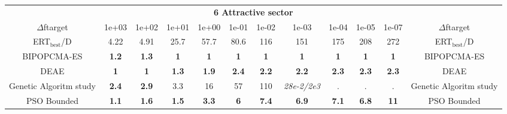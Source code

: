 \begin{tabular}{cccccccccccc}
 & \multicolumn{10}{c}{{\normalsize \textbf{6 Attractive sector}}}\\
$\Delta$ftarget& 1e+03& 1e+02& 1e+01& 1e+00& 1e-01& 1e-02& 1e-03& 1e-04& 1e-05& 1e-07 & $\Delta$ftarget \\
ERT$_{\textrm{best}}$/D& 4.22& 4.91& 25.7& 57.7& 80.6& 116& 151& 175& 208& 272 & ERT$_{\textrm{best}}$/D \\
\hline
BIPOPCMA-ES & \textbf{1.2} & \textbf{1.3} & \textbf{1} & \textbf{1} & \textbf{1} & \textbf{1} & \textbf{1} & \textbf{1} & \textbf{1} & \textbf{1} & BIPOPCMA-ES \cite{add_an_entry_for_BIPOPCMA-ES_in_bbob.bib}\\
DEAE & \textbf{1} & \textbf{1} & \textbf{1.3} & \textbf{1.9} & \textbf{2.4} & \textbf{2.2} & \textbf{2.2} & \textbf{2.3} & \textbf{2.3} & \textbf{2.3} & DEAE \cite{add_an_entry_for_DEAE_in_bbob.bib}\\
Genetic Algoritm study & \textbf{2.4} & \textbf{2.9} & 3.3 & 16 & 57 & 110 & \textit{28e-2}\textit{/2e3} & . & . & . & Genetic Algoritm study \cite{add_an_entry_for_Genetic Algoritm study_in_bbob.bib}\\
PSO Bounded & \textbf{1.1} & \textbf{1.6} & \textbf{1.5} & \textbf{3.3} & \textbf{6} & \textbf{7.4} & \textbf{6.9} & \textbf{7.1} & \textbf{6.8} & \textbf{11} & PSO Bounded \cite{add_an_entry_for_PSO Bounded_in_bbob.bib}
\end{tabular}

